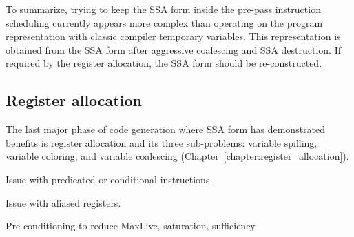 To summarize, trying to keep the SSA form inside the pre-pass instruction scheduling
currently appears more complex than operating on the program representation with
classic compiler temporary variables. This representation is obtained from the
SSA form after aggressive coalescing and SSA destruction. If required by the
register allocation, the SSA form should be re-constructed.

\subsection{Register allocation}

The last major phase of code generation where SSA form has demonstrated benefits
is register allocation and its three sub-problems: variable spilling, variable
coloring, and variable coalescing (Chapter~\ref{chapter:register_allocation}).

Issue with predicated or conditional instructions.
\cite{Eichenberger:1995:MICRO} \cite{Johnson:1996:MICRO}

Issue with aliased registers.

Pre conditioning to reduce MaxLive, saturation, sufficiency

